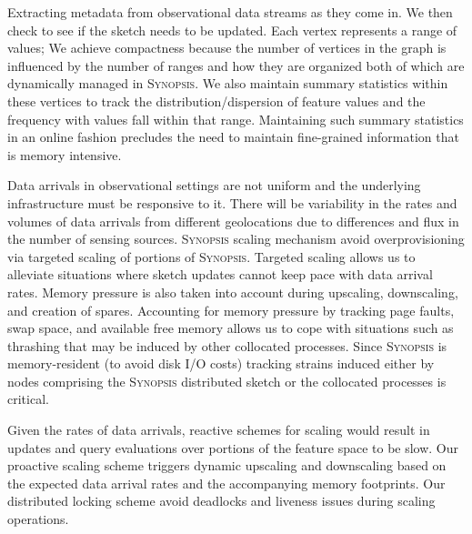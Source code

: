 \begin{description}[leftmargin=*]
\item[RQ-1:] Extracting metadata from observational data streams as they come in. We then check to see if the sketch needs to be updated. Each vertex represents a range of values; 
We achieve compactness because the number of vertices in the graph is influenced by the number of ranges and how they are organized both of which are dynamically managed in \textsc{Synopsis}.  We also maintain summary statistics within these vertices to track the distribution/dispersion of feature values and the frequency with values fall within that range. Maintaining such summary statistics in an online fashion precludes the need to maintain fine-grained information that is memory intensive.

\item[RQ-2:] Data arrivals in observational settings are not uniform and the underlying infrastructure must be responsive to it.  There will be variability in the rates and volumes of data arrivals from different geolocations due to differences and flux in the number of sensing sources. \textsc{Synopsis} scaling mechanism avoid overprovisioning via targeted scaling of portions of \textsc{Synopsis}. 
Targeted scaling allows us to alleviate situations where sketch updates cannot keep pace with data arrival rates.  Memory pressure is also taken into account during upscaling, downscaling, and creation of spares. Accounting for memory pressure by tracking page faults, swap space, and available free memory allows us to cope with situations such as thrashing that may be induced by other collocated processes. Since \textsc{Synopsis} is memory-resident (to avoid disk I/O costs) tracking strains induced either by nodes comprising the \textsc{Synopsis} distributed sketch or the collocated processes is critical.

Given the rates of data arrivals, reactive schemes for scaling would result in updates and query evaluations over portions of the feature space to be slow. Our proactive scaling scheme triggers dynamic upscaling and downscaling based on the expected data arrival rates and the accompanying memory footprints. Our distributed locking scheme avoid deadlocks and liveness issues during scaling operations.


\end{description}
